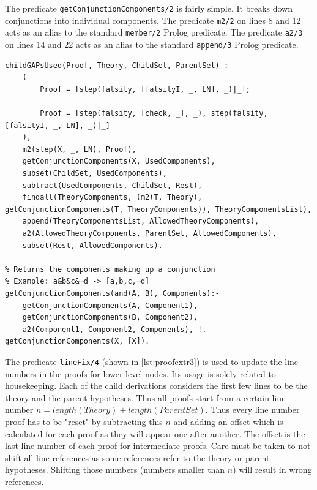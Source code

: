 \documentclass[11pt,twoside,a4paper]{report}
\begin{document}
The predicate \lstinline$getConjunctionComponents/2$ is fairly simple. It breaks down conjunctions into individual components. The predicate \lstinline$m2/2$ on lines 8 and 12 acts as an alias to the standard \lstinline$member/2$ Prolog predicate. The predicate \lstinline$a2/3$ on lines 14 and 22 acts as an alias to the standard \lstinline$append/3$ Prolog predicate.

\begin{lstlisting}[caption={Second part of the proof extraction algorithm},label=lst:proofextr2]
% Make sure that all the (negations of the) child hypotheses were used in the attack
childGAPsUsed(Proof, Theory, ChildSet, ParentSet) :-
	(
		Proof = [step(falsity, [falsityI, _, LN], _)|_];
		
		Proof = [step(falsity, [check, _], _), step(falsity, [falsityI, _, LN], _)|_]
	),
	m2(step(X, _, LN), Proof),
	getConjunctionComponents(X, UsedComponents),
	subset(ChildSet, UsedComponents),
	subtract(UsedComponents, ChildSet, Rest),
	findall(TheoryComponents, (m2(T, Theory), getConjunctionComponents(T, TheoryComponents)), TheoryComponentsList),
	append(TheoryComponentsList, AllowedTheoryComponents),
	a2(AllowedTheoryComponents, ParentSet, AllowedComponents),
	subset(Rest, AllowedComponents).

% Returns the components making up a conjunction
% Example: a&b&c&¬d -> [a,b,c,¬d]
getConjunctionComponents(and(A, B), Components):-
	getConjunctionComponents(A, Component1),
	getConjunctionComponents(B, Component2),
	a2(Component1, Component2, Components), !.
getConjunctionComponents(X, [X]).
\end{lstlisting}

The predicate \lstinline$lineFix/4$ (shown in \autoref{lst:proofextr3}) is used to update the line numbers in the proofs for lower-level nodes. Its usage is solely related to housekeeping. Each of the child derivations considers the first few lines to be the theory and the parent hypotheses. Thus all proofs start from a certain line number $n = length(Theory) + length(Parent Set)$. Thus every line number proof has to be "reset" by subtracting this $n$ and adding an offset which is calculated for each proof as they will appear one after another. The offset is the last line number of each proof for intermediate proofs. Care must be taken to not shift all line references as some references refer to the theory or parent hypotheses. Shifting those numbers (numbers smaller than $n$) will result in wrong references.
\end{document}
